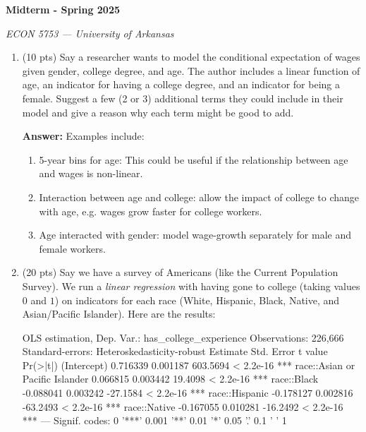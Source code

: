 \documentclass[12pt]{article}
\newcommand{\answer}[1]{{\color{blue_winged_teal}\textbf{Answer:} #1}}
\newcommand{\pts}[1]{{\color{zinc500}(#1 pts)}}
\begin{document}
\begin{center}
  {\Huge\bf Midterm - Spring 2025}

  \smallskip
  {\large\it ECON 5753 — University of Arkansas}
\end{center}

\medskip
\begin{enumerate}
  \item \pts{10} Say a researcher wants to model the conditional expectation of wages given gender, college degree, and age. The author includes a linear function of age, an indicator for having a college degree, and an indicator for being a female. Suggest a few (2 or 3) additional terms they could include in their model and give a reason why each term might be good to add.

    \answer{
      Examples include:
      \begin{enumerate}
        \item 5-year bins for age: This could be useful if the relationship between age and wages is non-linear.

        \item Interaction between age and college: allow the impact of college to change with age, e.g. wages grow faster for college workers.

        \item Age interacted with gender: model wage-growth separately for male and female workers.
      \end{enumerate}
    }

    \bigskip
  \item \pts{20} Say we have a survey of Americans (like the Current Population Survey). We run a \emph{linear regression} with having gone to college (taking values $0$ and $1$) on indicators for each race (White, Hispanic, Black, Native, and Asian/Pacific Islander). Here are the results:
    \begin{codeblock}[{}]
      OLS estimation, Dep. Var.: has_college_experience
      Observations: 226,666
      Standard-errors: Heteroskedasticity-robust
      Estimate Std. Error  t value  Pr(>|t|)
      (Intercept)                      0.716339   0.001187 603.5694 < 2.2e-16 ***
      race::Asian or Pacific Islander  0.066815   0.003442  19.4098 < 2.2e-16 ***
      race::Black                     -0.088041   0.003242 -27.1584 < 2.2e-16 ***
      race::Hispanic                  -0.178127   0.002816 -63.2493 < 2.2e-16 ***
      race::Native                    -0.167055   0.010281 -16.2492 < 2.2e-16 ***
      ---
      Signif. codes:  0 '***' 0.001 '**' 0.01 '*' 0.05 '.' 0.1 ' ' 1
    \end{codeblock}


\end{enumerate}
\end{document}
